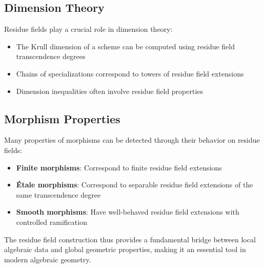 \documentclass{article}
\theoremstyle{definition}
\begin{document}
\subsection{Dimension Theory}

Residue fields play a crucial role in dimension theory:

\begin{itemize}
\item The Krull dimension of a scheme can be computed using residue field transcendence degrees
\item Chains of specializations correspond to towers of residue field extensions
\item Dimension inequalities often involve residue field properties
\end{itemize}

\subsection{Morphism Properties}

Many properties of morphisms can be detected through their behavior on residue fields:

\begin{itemize}
\item \textbf{Finite morphisms}: Correspond to finite residue field extensions
\item \textbf{Étale morphisms}: Correspond to separable residue field extensions of the same transcendence degree
\item \textbf{Smooth morphisms}: Have well-behaved residue field extensions with controlled ramification
\end{itemize}

The residue field construction thus provides a fundamental bridge between local algebraic data and global geometric properties, making it an essential tool in modern algebraic geometry.
\end{document}
